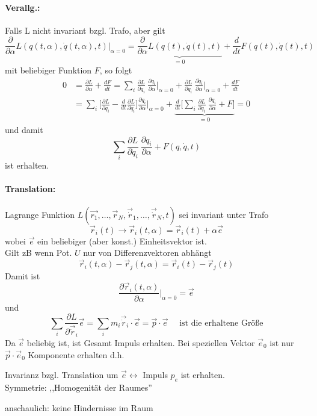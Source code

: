\documentclass[titlepage,12pt,a4paper,ngerman]{report}
\newcommand{\tx}[1]{\textrm{#1}}
\newcommand{\rbox}[1]{\begin{tcolorbox}[colback=white,colframe=red!75!black]#1\end{tcolorbox}} %
\begin{document}
{\paragraph{Verallg.:} Falls L nicht invariant bzgl. Trafo, aber gilt $$\frac{\partial}{\partial \alpha} L(q(t, \alpha), \dot q (t, \alpha), t) \bigg|_{\alpha = 0} = \underbrace{\frac{\partial}{\partial \alpha} L (q(t), \dot q (t), t)}_{= 0} + \frac{d}{dt}F(q(t), \dot q (t), t)$$
mit beliebiger Funktion $F$, so folgt
\begin{align*}
0 &= \frac{\partial L}{\partial \alpha} + \frac{dF}{dt} = \sum_i \frac{\partial L}{\partial q_i}\ \frac{\partial q_i}{\partial \alpha}\bigg|_{\alpha=0} + \frac{\partial L}{\partial \dot q_i}\ \frac{\partial \dot q_i}{\partial \alpha}\bigg|_{\alpha=0} + \frac{dF}{dt}\\
&= \sum_i \bigg[ \frac{\partial L}{\partial q_i} - \frac{d}{dt} \frac{\partial L}{\partial \dot q_i} \bigg] \frac{\partial q_i}{\partial \alpha} \bigg|_{\alpha = 0} +  \underbrace{\frac{d}{dt} \bigg[ \sum_i \frac{\partial L}{\partial \dot q_i}\ \frac{\partial q_i}{\partial \alpha} + F \bigg]}_{= 0} = 0
\end{align*}
und damit 
\begin{equation*}
\sum_i \frac{\partial L}{\partial \dot q_i}\ \frac{\partial q_i}{\partial \alpha} + F(q, \dot q, t) \tag{$*$}
\end{equation*}
ist erhalten.
\paragraph{Translation:} Lagrange Funktion $L(\vec{r_1}, \dots , \vec{r}_N, \vec{\dot r}_1, \dots, \vec{\dot r}_N, t)$ sei invariant unter Trafo
$$\vec{r}_i (t) \rightarrow \vec{r}_i (t,\alpha) = \vec{r}_i (t) + \alpha\vec{e}$$
wobei $\vec{e}$ ein beliebiger (aber konst.) Einheitsvektor ist.\\
Gilt zB wenn Pot. $U$ nur von Differenzvektoren abhängt
$$\vec{r}_i (t, \alpha) - \vec{r}_j (t, \alpha) = \vec{r}_i (t) - \vec{r}_j (t)$$
Damit ist $$\frac{\partial \vec{r}_i (t,\alpha)}{\partial \alpha} \bigg|_{\alpha = 0} = \vec{e}$$
und $$\sum_i \frac{\partial L}{\partial \vec{\dot r}_i} \vec{e} = \sum_i m_i \vec{\dot r}_i \cdot \vec{e} = \vec{p} \cdot \vec{e} \quad \tx{ ist die erhaltene Größe}$$
Da $\vec{e}$ beliebig ist, ist Gesamt Impuls erhalten. Bei speziellen Vektor $\vec{e}_0$ ist nur $\vec{p} \cdot \vec{e}_0$ Komponente erhalten d.h.\\
\rbox{
	Invarianz bzgl. Translation um $\vec{e} \leftrightarrow$ Impuls $p_e$ ist erhalten.\\
	Symmetrie: ,,Homogenität der Raumes''
}
anschaulich: keine Hindernisse im Raum

}
\end{document}
